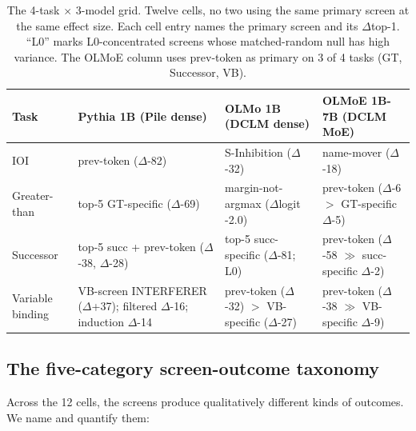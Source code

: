 \documentclass[11pt]{article}
\begin{document}
\begin{table}[h]
\centering
\small
\begin{tabular}{lp{3.5cm}p{3.5cm}p{4cm}}
\toprule
Task & Pythia 1B (Pile dense) & OLMo 1B (DCLM dense) & OLMoE 1B-7B (DCLM MoE) \\
\midrule
IOI & prev-token ($\Delta$-82) & S-Inhibition ($\Delta$-32) & name-mover ($\Delta$-18) \\
Greater-than & top-5 GT-specific ($\Delta$-69) & margin-not-argmax ($\Delta$logit -2.0) & prev-token ($\Delta$-6 $>$ GT-specific $\Delta$-5) \\
Successor & top-5 succ + prev-token ($\Delta$-38, $\Delta$-28) & top-5 succ-specific ($\Delta$-81; L0) & prev-token ($\Delta$-58 $\gg$ succ-specific $\Delta$-2) \\
Variable binding & VB-screen INTERFERER ($\Delta$+37); filtered $\Delta$-16; induction $\Delta$-14 & prev-token ($\Delta$-32) $>$ VB-specific ($\Delta$-27) & prev-token ($\Delta$-38 $\gg$ VB-specific $\Delta$-9) \\
\bottomrule
\end{tabular}
\caption{The 4-task $\times$ 3-model grid. Twelve cells, no two using the same primary screen at the same effect size. Each cell entry names the primary screen and its $\Delta$top-1. ``L0'' marks L0-concentrated screens whose matched-random null has high variance. The OLMoE column uses prev-token as primary on 3 of 4 tasks (GT, Successor, VB).}
\label{tab:full-grid}
\end{table}

\subsection{The five-category screen-outcome taxonomy}

Across the 12 cells, the screens produce qualitatively different kinds of outcomes. We name and quantify them:
\end{document}
